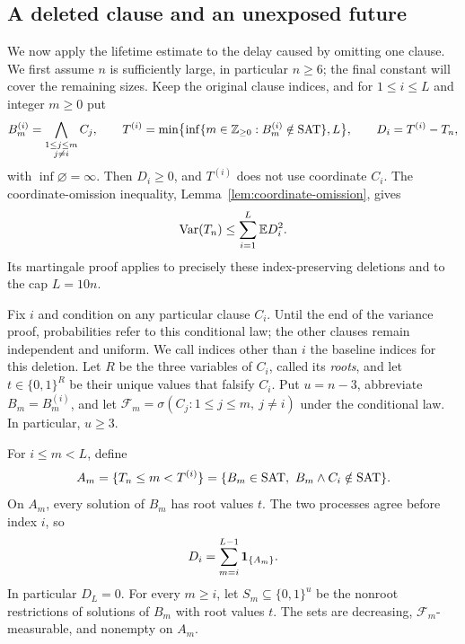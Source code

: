 \subsection{A deleted clause and an unexposed future}

We now apply the lifetime estimate to the delay caused by omitting one
clause.  We first assume \(n\) is sufficiently large, in particular
\(n\ge6\); the final constant will cover the remaining sizes.  Keep
the original clause indices, and for \(1\le i\le L\) and
integer \(m\ge0\) put
\[
 B_m^{(i)}=\bigwedge_{\substack{1\le j\le m\\j\ne i}}C_j,
 \qquad
 T^{(i)}=\min\bigl\{\inf\{m\in\mathbb Z_{\ge0}:
                   B_m^{(i)}\notin\mathrm{SAT}\},L\bigr\},
 \qquad D_i=T^{(i)}-T_n,
\]
with \(\inf\varnothing=\infty\).  Then \(D_i\ge0\), and
\(T^{(i)}\) does not use coordinate \(C_i\).  The coordinate-omission
inequality, Lemma~\ref{lem:coordinate-omission}, gives
\begin{equation}\label{eq:prefix-omission}
 \operatorname{Var}(T_n)\le\sum_{i=1}^{L}\mathbb E D_i^2.
\end{equation}
Its martingale proof applies to precisely these index-preserving
deletions and to the cap \(L=10n\).

Fix \(i\) and condition on any particular clause \(C_i\).  Until the
end of the variance proof, probabilities refer to this conditional law;
the other clauses remain independent and uniform.  We call indices other
than \(i\) the baseline indices for this deletion.  Let \(R\) be the
three variables of \(C_i\), called its \emph{roots}, and let
\(t\in\{0,1\}^{R}\) be their unique values that falsify \(C_i\).
Put \(u=n-3\), abbreviate \(B_m=B_m^{(i)}\), and let
\(\mathcal F_m=\sigma(C_j:1\le j\le m,\ j\ne i)\) under the
conditional law.  In particular, \(u\ge3\).

For \(i\le m<L\), define
\begin{equation}\label{eq:prefix-delay-events}
 A_m=\{T_n\le m<T^{(i)}\}
     =\{B_m\in\mathrm{SAT},\ B_m\wedge C_i\notin\mathrm{SAT}\}.
\end{equation}
On \(A_m\), every solution of \(B_m\) has root values \(t\).
The two processes agree before index \(i\), so
\begin{equation}\label{eq:prefix-delay-sum}
 D_i=\sum_{m=i}^{L-1}\mathbf 1_{\{A_m\}}.
\end{equation}
In particular \(D_L=0\).  For every \(m\ge i\), let
\(S_m\subseteq\{0,1\}^u\) be the nonroot restrictions of solutions
of \(B_m\) with root values \(t\).  The sets are decreasing,
\(\mathcal F_m\)-measurable, and nonempty on \(A_m\).

